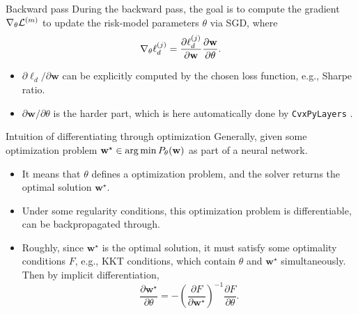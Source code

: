 \documentclass[10pt,aspectratio=169]{beamer}
\newcommand{\Loss}{\mathcal{L}}
\newcommand{\Param}{\theta}
\begin{document}
\begin{frame}{Backward pass}
\small
  During the backward pass, the goal is to compute the gradient $\grad_\Param \Loss^{(m)}$ to update the risk-model parameters $\Param$ via SGD, where 
  \[
    \grad_\Param \ell_d^{(j)}
    =
    \frac{\partial \ell_d^{(j)}}{\partial \mathbf{w}}
    \frac{\partial \mathbf{w}}{\partial \Param}.
  \]

  \begin{itemize}
    \item $\partial \ell_d/\partial \mathbf{w}$ can be explicitly computed by the chosen loss function, e.g., Sharpe ratio.
    \item $\partial \mathbf{w}/\partial\Param$ is the harder part, which is here automatically done by \texttt{CvxPyLayers} \parencite{AgrawalAmosEtAl2019Layers}.
  \end{itemize}

  \begin{block}{\footnotesize Intuition of differentiating through optimization}
    \scriptsize
    Generally, given some optimization problem $\mathbf{w}^\star \in \argmin P_\Param(\mathbf{w})$ as part of a neural network.
    \begin{itemize}
      \item It means that $\Param$ defines a optimization problem, and the solver returns the optimal solution $\mathbf{w}^\star$. 
      \item Under some regularity conditions, this optimization problem is differentiable, can be backpropagated through.
      \item Roughly, since $\mathbf{w}^\star$ is the optimal solution, it must satisfy some optimality conditions $F$, e.g., KKT conditions, which contain $\Param$ and $\mathbf{w}^\star$ simultaneously. Then by implicit differentiation,
      \[
       \frac{\partial \mathbf{w}^\star}{\partial \Param} = -\left(\frac{\partial F}{\partial \mathbf{w}^\star}\right)^{-1} \frac{\partial F}{\partial \Param}.
      \]
    \end{itemize}
  \end{block}
\end{frame}
\end{document}
